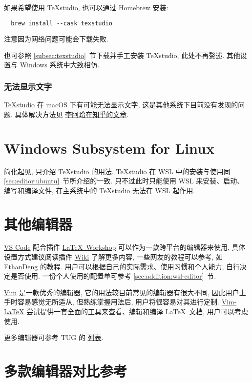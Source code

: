 如果希望使用 \TeX studio, 也可以通过 Homebrew 安装:
\begin{lstlisting}
  brew install --cask texstudio
\end{lstlisting}
注意因为网络问题可能会下载失败.

也可参照 \ref{subsec:texstudio}~节下载并手工安装 \TeX studio, 此处不再赘述.
其他设置与 Windows 系统中大致相仿.

\subsubsection{无法显示文字}

\TeX studio 在 macOS 下有可能无法显示文字,
这是其他系统下目前没有发现的问题.
具体解决方法见%
\href{https://zhuanlan.zhihu.com/p/80728204}{李阿玲在知乎的文章}.

\section{Windows Subsystem for Linux}\label{sec:editor:wsl}

简化起见,
只介绍 \TeX studio 的用法.
\TeX studio 在 WSL 中的安装与使用同 \ref{sec:editor:ubuntu}~节所介绍的一致.
只不过此时只能使用 WSL 来安装、启动、编写和编译文件,
在主系统中的 \TeX studio 无法在 WSL 起作用.

\section{其他编辑器}

\href{https://code.visualstudio.com/}{VS Code}
配合插件
\href{https://marketplace.visualstudio.com/items?itemName=James-Yu.latex-workshop}{\LaTeX\ Workshop}
可以作为一款跨平台的编辑器来使用,
具体设置方式建议阅读插件
\href{https://github.com/James-Yu/LaTeX-Workshop/wiki}{Wiki}
了解更多内容,
一些网友的教程可以参考,
如
\href{https://github.com/EthanDeng/vscode-latex}{EthanDeng}
的教程.
用户可以根据自己的实际需求、使用习惯和个人能力,
自行决定是否使用.
一份个人使用的配置单可参考 \ref{sec:addition:wsl-editor}~节.

\href{https://www.vim.org/}{Vim} 是一款优秀的编辑器,
它的用法较目前常见的编辑器有很大不同,
因此用户上手时容易感觉无所适从,
但熟练掌握用法后,
用户将很容易对其进行定制.
\href{http://vim-latex.sourceforge.net/}{Vim-LaTeX}
尝试提供一套全面的工具来查看、编辑和编译 \LaTeX\ 文档,
用户可以考虑使用.

更多编辑器可参考 TUG 的%
\href{https://tug.org/interest.html#editors}{列表}.

\section{多款编辑器对比参考}

